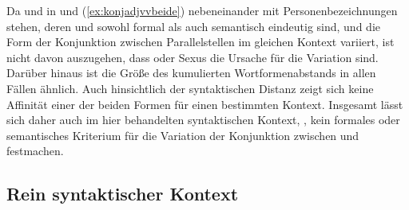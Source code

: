 \begin{exe}
	
\end{exe}

Da  und  in  und
(\ref{ex:konjadjvvbeide}) nebeneinander mit Personenbezeichnungen stehen, deren
 und  sowohl formal als auch semantisch eindeutig sind,
und die Form der Konjunktion zwischen Parallelstellen im
gleichen Kontext variiert, ist nicht davon auszugehen, dass  oder
Sexus die Ursache für die Variation sind. Darüber hinaus ist die Größe des
kumulierten Wortformenabstands in allen Fällen ähnlich.
Auch hinsichtlich der syntaktischen Distanz zeigt sich
keine Affinität einer der beiden Formen für einen bestimmten Kontext. Insgesamt
lässt sich daher auch im hier behandelten syntaktischen Kontext,
, kein formales oder semantisches Kriterium
für die Variation der Konjunktion zwischen  und 
festmachen.


\subsection{Rein syntaktischer Kontext}
\label{subsec:kcbeidquantsyncont}


